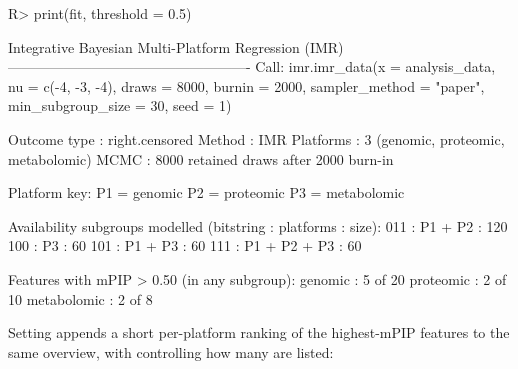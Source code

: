 \documentclass[article]{jss}
\begin{document}
\begin{CodeChunk}
\begin{CodeInput}
R> print(fit, threshold = 0.5)
\end{CodeInput}
\begin{CodeOutput}
Integrative Bayesian Multi-Platform Regression (IMR)
----------------------------------------------------
Call:
  imr.imr_data(x = analysis_data, nu = c(-4, -3, -4), draws = 8000, 
    burnin = 2000, sampler_method = "paper", min_subgroup_size = 30, 
    seed = 1)

Outcome type : right.censored
Method       : IMR
Platforms    : 3 (genomic, proteomic, metabolomic)
MCMC         : 8000 retained draws after 2000 burn-in

Platform key:
  P1 = genomic
  P2 = proteomic
  P3 = metabolomic

Availability subgroups modelled (bitstring : platforms : size):
  011 : P1 + P2      : 120
  100 : P3           : 60
  101 : P1 + P3      : 60
  111 : P1 + P2 + P3 : 60

Features with mPIP > 0.50 (in any subgroup):
  genomic      : 5 of 20
  proteomic    : 2 of 10
  metabolomic  : 2 of 8
\end{CodeOutput}
\end{CodeChunk}

Setting  appends a short per-platform ranking of the
highest-mPIP features to the same overview, with  controlling how many
are listed:
\end{document}
